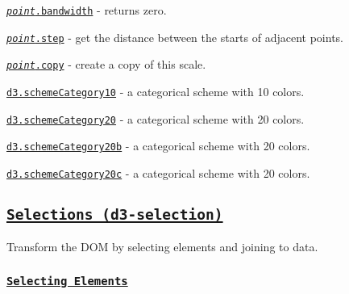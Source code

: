\begin{DoxyItemize}
\item \href{https://github.com/d3/d3-scale/blob/master/README.md#point_bandwidth}{\tt {\itshape point}.bandwidth} -\/ returns zero.
\item \href{https://github.com/d3/d3-scale/blob/master/README.md#point_step}{\tt {\itshape point}.step} -\/ get the distance between the starts of adjacent points.
\item \href{https://github.com/d3/d3-scale/blob/master/README.md#point_copy}{\tt {\itshape point}.copy} -\/ create a copy of this scale.
\item \href{https://github.com/d3/d3-scale/blob/master/README.md#schemeCategory10}{\tt d3.\+scheme\+Category10} -\/ a categorical scheme with 10 colors.
\item \href{https://github.com/d3/d3-scale/blob/master/README.md#schemeCategory20}{\tt d3.\+scheme\+Category20} -\/ a categorical scheme with 20 colors.
\item \href{https://github.com/d3/d3-scale/blob/master/README.md#schemeCategory20b}{\tt d3.\+scheme\+Category20b} -\/ a categorical scheme with 20 colors.
\item \href{https://github.com/d3/d3-scale/blob/master/README.md#schemeCategory20c}{\tt d3.\+scheme\+Category20c} -\/ a categorical scheme with 20 colors.
\end{DoxyItemize}

\subsection*{\href{https://github.com/d3/d3-selection}{\tt Selections (d3-\/selection)}}

Transform the D\+OM by selecting elements and joining to data.

\subsubsection*{\href{https://github.com/d3/d3-selection/blob/master/README.md#selecting-elements}{\tt Selecting Elements}}


